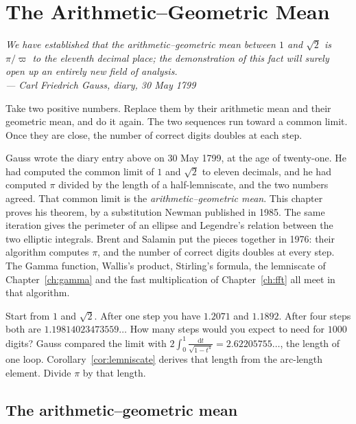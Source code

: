 \chapter{The Arithmetic--Geometric Mean}\label{ch:agm}

\begin{center}\itshape
We have established that the arithmetic--geometric mean between $1$ and $\sqrt2$ is $\pi/\varpi$ to the eleventh decimal place; the
demonstration of this fact will surely open up an entirely new field of analysis.\\
\upshape --- Carl Friedrich Gauss, diary, 30 May 1799
\end{center}

Take two positive numbers. Replace them by their arithmetic mean and their geometric mean, and do it again. The two sequences run toward a common limit. Once they are close, the number of correct digits doubles at each step.


Gauss wrote the diary entry above on 30 May 1799, at the age of twenty-one. He had computed the common limit of $1$ and $\sqrt2$ to eleven decimals, and he had computed $\pi$ divided by the length of a half-lemniscate, and the two numbers agreed. That common limit is the \emph{arithmetic--geometric mean}. This chapter proves his theorem, by a substitution Newman published in 1985. The same iteration gives the perimeter of an ellipse and Legendre's relation between the two elliptic integrals. Brent and Salamin put the pieces together in 1976: their algorithm computes $\pi$, and the number of correct digits doubles at every step. The Gamma function, Wallis's product, Stirling's formula, the lemniscate of Chapter~\ref{ch:gamma} and the fast multiplication of Chapter~\ref{ch:fft} all meet in that algorithm.

\begin{think}
Start from $1$ and $\sqrt2$. After one step you have $1.2071$ and $1.1892$. After four steps both are $1.19814023473559\ldots$ How many steps would you expect to need for $1000$ digits? Gauss compared the limit with $2\int_0^1\frac{\mathrm dt}{\sqrt{1-t^4}}=2.62205755\ldots$, the length of one loop. Corollary~\ref{cor:lemniscate} derives that length from the arc-length element. Divide $\pi$ by that length.
\end{think}

\section{The arithmetic--geometric mean}

